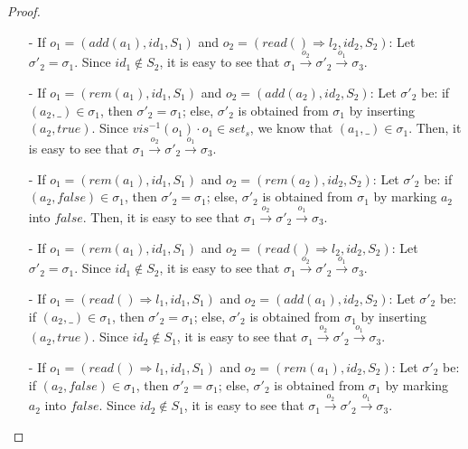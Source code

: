 {\begin {proof}
\begin{itemize}
\item[-] If $o_1 = (\mathit{add}(a_1),\mathit{id}_1,S_1)$ and $o_2 = (\mathit{read}() \Rightarrow l_2,\mathit{id}_2,S_2)$: Let $\sigma'_2 = \sigma_1$. Since $\mathit{id}_1 \notin S_2$, it is easy to see that $\sigma_1 {\xrightarrow{o_2}} \sigma'_2 {\xrightarrow{o_1}} \sigma_3$.

\item[-] If $o_1 = (\mathit{rem}(a_1),\mathit{id}_1,S_1)$ and $o_2 = (\mathit{add}(a_2),\mathit{id}_2,S_2)$: Let $\sigma'_2$ be: if $(a_2,\_) \in \sigma_1$, then $\sigma'_2 = \sigma_1$; else, $\sigma'_2$ is obtained from $\sigma_1$ by inserting $(a_2,\mathit{true})$. Since $\mathit{vis}^{-1}(o_1) \cdot o_1 \in \mathit{set}_s$, we know that $(a_1,\_) \in \sigma_1$. Then, it is easy to see that $\sigma_1 {\xrightarrow{o_2}} \sigma'_2 {\xrightarrow{o_1}} \sigma_3$.

\item[-] If $o_1 = (\mathit{rem}(a_1),\mathit{id}_1,S_1)$ and $o_2 = (\mathit{rem}(a_2),\mathit{id}_2,S_2)$: Let $\sigma'_2$ be: if $(a_2,\mathit{false}) \in \sigma_1$, then $\sigma'_2 = \sigma_1$; else, $\sigma'_2$ is obtained from $\sigma_1$ by marking $a_2$ into $\mathit{false}$. Then, it is easy to see that $\sigma_1 {\xrightarrow{o_2}} \sigma'_2 {\xrightarrow{o_1}} \sigma_3$.

\item[-] If $o_1 = (\mathit{rem}(a_1),\mathit{id}_1,S_1)$ and $o_2 = (\mathit{read}() \Rightarrow l_2,\mathit{id}_2,S_2)$: Let $\sigma'_2 = \sigma_1$. Since $\mathit{id}_1 \notin S_2$, it is easy to see that $\sigma_1 {\xrightarrow{o_2}} \sigma'_2 {\xrightarrow{o_1}} \sigma_3$.

\item[-] If $o_1 = (\mathit{read}() \Rightarrow l_1,\mathit{id}_1,S_1)$ and $o_2 = (\mathit{add}(a_1),\mathit{id}_2,S_2)$: Let $\sigma'_2$ be: if $(a_2,\_) \in \sigma_1$, then $\sigma'_2 = \sigma_1$; else, $\sigma'_2$ is obtained from $\sigma_1$ by inserting $(a_2,\mathit{true})$. Since $\mathit{id}_2 \notin S_1$, it is easy to see that $\sigma_1 {\xrightarrow{o_2}} \sigma'_2 {\xrightarrow{o_1}} \sigma_3$.

\item[-] If $o_1 = (\mathit{read}() \Rightarrow l_1,\mathit{id}_1,S_1)$ and $o_2 = (\mathit{rem}(a_1),\mathit{id}_2,S_2)$: Let $\sigma'_2$ be: if $(a_2,\mathit{false}) \in \sigma_1$, then $\sigma'_2 = \sigma_1$; else, $\sigma'_2$ is obtained from $\sigma_1$ by marking $a_2$ into $\mathit{false}$. Since $\mathit{id}_2 \notin S_1$, it is easy to see that $\sigma_1 {\xrightarrow{o_2}} \sigma'_2 {\xrightarrow{o_1}} \sigma_3$.


\end{itemize}
\end{proof}}
